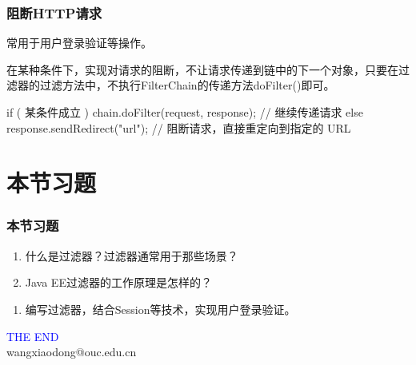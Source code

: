 \begin{frame}[fragile] %
\frametitle{阻断HTTP请求} 

常用于用户登录验证等操作。

在某种条件下，实现对请求的阻断，不让请求传递到链中的下一个对象，只要在过滤器的过滤方法中，不执行FilterChain的传递方法doFilter()即可。

\begin{javaCode}
if ( 某条件成立 ) {
  chain.doFilter(request, response); // 继续传递请求
} else {
  response.sendRedirect("url"); // 阻断请求，直接重定向到指定的 URL
}
\end{javaCode}
\end{frame}

\section{本节习题}

\begin{frame}
  \frametitle{本节习题}

  
  \begin{enumerate}
  \item 什么是过滤器？过滤器通常用于那些场景？
  \item Java EE过滤器的工作原理是怎样的？
  \end{enumerate}


  \begin{enumerate}
  \item 编写过滤器，结合Session等技术，实现用户登录验证。
  \end{enumerate}
\end{frame}

\begin{frame}
\centering
{\Huge \textcolor{blue}{THE END}} \\
\vspace{5mm}
{\Large wangxiaodong@ouc.edu.cn} \\
\end{frame}

